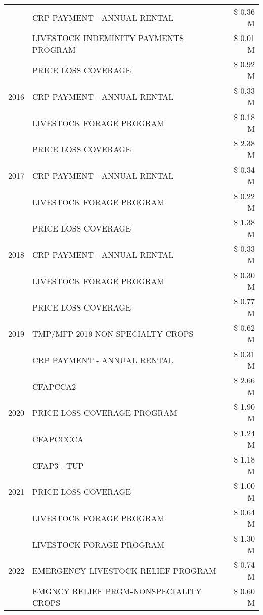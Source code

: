 \begin{tabular}{llr}
 & CRP PAYMENT - ANNUAL RENTAL & \$ 0.36 M \\
 & LIVESTOCK INDEMINITY PAYMENTS PROGRAM & \$ 0.01 M \\
\cline{1-3}
\multirow[t]{3}{*}{2016} & PRICE LOSS COVERAGE & \$ 0.92 M \\
 & CRP PAYMENT - ANNUAL RENTAL & \$ 0.33 M \\
 & LIVESTOCK FORAGE PROGRAM & \$ 0.18 M \\
\cline{1-3}
\multirow[t]{3}{*}{2017} & PRICE LOSS COVERAGE & \$ 2.38 M \\
 & CRP PAYMENT - ANNUAL RENTAL & \$ 0.34 M \\
 & LIVESTOCK FORAGE PROGRAM & \$ 0.22 M \\
\cline{1-3}
\multirow[t]{3}{*}{2018} & PRICE LOSS COVERAGE & \$ 1.38 M \\
 & CRP PAYMENT - ANNUAL RENTAL & \$ 0.33 M \\
 & LIVESTOCK FORAGE PROGRAM & \$ 0.30 M \\
\cline{1-3}
\multirow[t]{3}{*}{2019} & PRICE LOSS COVERAGE & \$ 0.77 M \\
 & TMP/MFP 2019 NON SPECIALTY CROPS & \$ 0.62 M \\
 & CRP PAYMENT - ANNUAL RENTAL & \$ 0.31 M \\
\cline{1-3}
\multirow[t]{3}{*}{2020} & CFAPCCA2 & \$ 2.66 M \\
 & PRICE LOSS COVERAGE PROGRAM & \$ 1.90 M \\
 & CFAPCCCCA & \$ 1.24 M \\
\cline{1-3}
\multirow[t]{3}{*}{2021} & CFAP3 - TUP & \$ 1.18 M \\
 & PRICE LOSS COVERAGE & \$ 1.00 M \\
 & LIVESTOCK FORAGE PROGRAM & \$ 0.64 M \\
\cline{1-3}
\multirow[t]{3}{*}{2022} & LIVESTOCK FORAGE PROGRAM & \$ 1.30 M \\
 & EMERGENCY LIVESTOCK RELIEF PROGRAM & \$ 0.74 M \\
 & EMGNCY RELIEF PRGM-NONSPECIALITY CROPS & \$ 0.60 M \\
\cline{1-3}
\bottomrule
\end{tabular}
